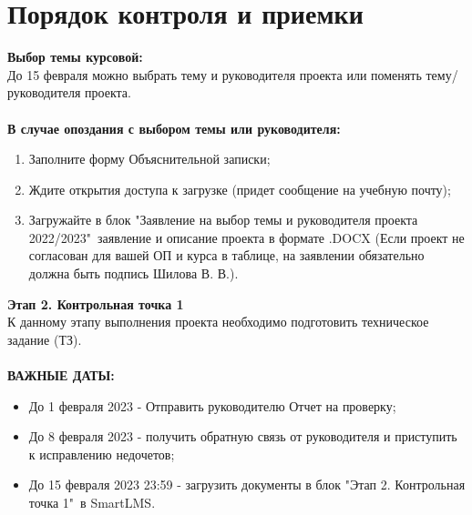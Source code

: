 \documentclass[draft]{article}
\begin{document}
\section {Порядок контроля и приемки}
\textbf{Выбор темы курсовой:}\\
До 15 февраля можно выбрать тему и руководителя проекта или поменять тему/руководителя проекта.\\
~\\
\textbf{В случае опоздания с выбором темы или руководителя:}
\begin{enumerate}
\item Заполните форму Объяснительной записки;
\item Ждите открытия доступа к загрузке (придет сообщение на учебную почту);
\item Загружайте в блок "{}Заявление на выбор темы и руководителя проекта 2022/2023"{}\ заявление и описание проекта в формате .DOCX (Если проект не согласован для вашей ОП и курса в таблице, на заявлении обязательно должна быть подпись Шилова В. В.).
\end{enumerate}
\textbf{Этап 2. Контрольная точка 1}\\
К данному этапу выполнения проекта необходимо подготовить техническое задание (ТЗ).\\
~\\
\textbf{ВАЖНЫЕ ДАТЫ:}
\begin{itemize}
\item До 1 февраля 2023 - Отправить руководителю Отчет на проверку;
\item До 8 февраля 2023 - получить обратную связь от руководителя и приступить к исправлению недочетов;
\item До 15 февраля 2023 23:59 - загрузить документы в блок "{}Этап 2. Контрольная точка 1"{}\ в SmartLMS.
\end{itemize}
\newpage
{}
\end{document}
